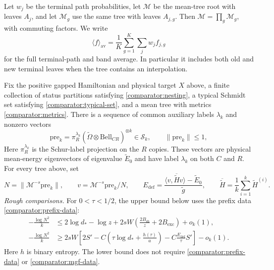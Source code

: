 Let $w_j$ be the terminal path probabilities, let $\mathcal M$ be the
mean-tree root with leaves $A_j$, and let $\mathcal M_g$ use the same
tree with leaves $A_{j,g}$.  Then
$\mathcal M=\prod_g\mathcal M_g$, with commuting factors.  We write
\[
 \langle f\rangle_{\mathrm{av}}=
       \frac1K\sum_{g=1}^K\sum_jw_j f_{j,g}
\]
for the full terminal-path and band average.  In particular it includes
both old and new terminal leaves when the tree contains an interpolation.

\begin{proposition}
\label{prop:comparators}
Fix the positive gapped Hamiltonian and physical target $X$ above,
a finite collection of status partitions satisfying
\eqref{comparator:nesting}, a typical Schmidt set satisfying
\eqref{comparator:typical-set}, and a mean tree with metrics
\eqref{comparator:metrics}. There is a sequence of common auxiliary
labels $\lambda_k$ and nonzero vectors
\begin{equation}
 \mathrm{pre}_k=\pi_R^{\lambda_k}
  (\widetilde\Omega\otimes\mathrm{Bell}_{CR})^{\otimes k}
       \in\mathcal S_k,
 \qquad \|\mathrm{pre}_k\|\le1,
 \label{comparator:prevector}
\end{equation}
Here $\pi_R^{\lambda_k}$ is the Schur-label projection on the $R$ copies.
These vectors are physical mean-energy eigenvectors of eigenvalue
$\widetilde E_0$ and have label $\lambda_k$ on both $C$ and $R$.
For every tree above, set
\[
 N=\|\mathcal M^{-s}\mathrm{pre}_k\|,
 \qquad v=\mathcal M^{-s}\mathrm{pre}_k/N,
 \qquad
 E_{\mathrm{def}}=
 \frac{\langle v,\overline{\widetilde H}v\rangle-\widetilde E_0}
      {\widetilde g},
 \qquad
 \overline{\widetilde H}=\frac1k\sum_{i=1}^k\widetilde H^{(i)}.
\]
\emph{Rough comparisons.} For $0<\tau<1/2$, the upper bound below
uses the prefix data \eqref{comparator:prefix-data}:
\begin{align}
 -\frac{\log N^2}{k}
 &\le 2\log d_*-\log z+
       2sW\left(\frac{2B_{\mathrm{sh}}}{z}+2B_{\mathrm{exc}}\right)
       +o_k(1),
 \label{comparator:rough-upper}\\
 -\frac{\log N^2}{k}
 &\ge 2sW\left[
       2S'-C\left(\tau\log d_*+\frac{h(\tau)}a\right)
       -C\frac{E_{\mathrm{def}}}{\tau}S'\right]-o_k(1).
 \label{comparator:rough-lower}
\end{align}
Here $h$ is binary entropy.  The lower bound does not require
\eqref{comparator:prefix-data} or \eqref{comparator:mgf-data}.


\end{proposition}
